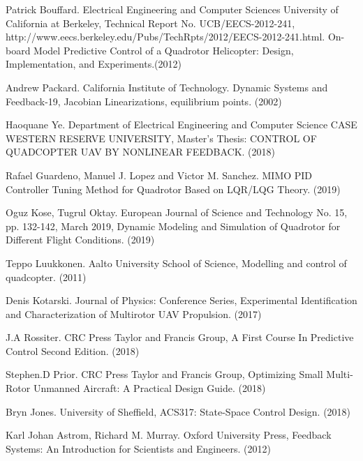 \documentclass[12pt,a4paper,twoside]{report}
\begin{document}
\begin{thebibliography}{20}
		Patrick Bouffard. Electrical Engineering and Computer Sciences University of California at Berkeley, Technical Report No. UCB/EECS-2012-241, http://www.eecs.berkeley.edu/Pubs/TechRpts/2012/EECS-2012-241.html. 
		On-board Model Predictive Control of a Quadrotor Helicopter: Design, Implementation, and Experiments.(2012)
		
     	Andrew Packard. California Institute of Technology. Dynamic Systems and Feedback-19, Jacobian Linearizations, equilibrium points. (2002)
     	
		Haoquane Ye. Department of Electrical Engineering and Computer Science CASE WESTERN RESERVE UNIVERSITY, Master's Thesis: CONTROL OF QUADCOPTER UAV BY NONLINEAR FEEDBACK. (2018)
		
		Rafael Guardeno, Manuel J. Lopez and Victor M. Sanchez. MIMO PID Controller Tuning Method for Quadrotor Based on LQR/LQG Theory. (2019)
		
		Oguz Kose, Tugrul Oktay. European Journal of Science and Technology No. 15, pp. 132-142, March 2019, Dynamic Modeling and Simulation of Quadrotor for Different Flight Conditions. (2019)
		
		Teppo Luukkonen. Aalto University School of Science, Modelling and control of quadcopter. (2011)
		
		Denis Kotarski. Journal of Physics: Conference Series, Experimental Identification and Characterization of Multirotor UAV Propulsion. (2017)
		
		J.A Rossiter. CRC Press Taylor and Francis Group, A First Course In Predictive Control Second Edition. (2018)
		
		Stephen.D Prior. CRC Press Taylor and Francis Group, Optimizing Small Multi-Rotor Unmanned Aircraft: A Practical Design Guide. (2018)
		
		Bryn Jones. University of Sheffield, ACS317: State-Space Control Design. (2018)
		
		Karl Johan Astrom,	Richard M. Murray. Oxford University Press, Feedback Systems: An Introduction for Scientists and Engineers. (2012)
		
	\end{thebibliography}
	
\end{document}
